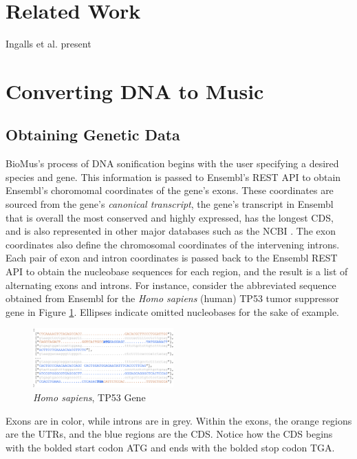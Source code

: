 \documentclass[letterpaper]{article}
\begin{document}
\section{Related Work}

Ingalls et al. present 
\section{Converting DNA to Music}
\subsection{Obtaining Genetic Data}
BioMus's process of DNA sonification begins with the user specifying a desired species and gene. This information is passed to Ensembl's REST API to obtain Ensembl's choromomal coordinates of the gene's exons. These coordinates are sourced from the gene's \textit{canonical transcript}, the gene's transcript in Ensembl that is overall the most conserved and highly expressed, has the longest CDS, and is also represented in other major databases such as the NCBI \cite{ensembl_transcript_flags}. The exon coordinates also define the chromosomal coordinates of the intervening introns. Each pair of exon and intron coordinates is passed back to the Ensembl REST API to obtain the nucleobase sequences for each region, and the result is a list of alternating exons and introns. For instance, consider the abbreviated sequence obtained from Ensembl for the \textit{Homo sapiens} (human) TP53 tumor suppressor gene in Figure \ref{fig:pre_processed_seq_homo_sapiens_tp53}. Ellipses indicate omitted nucleobases for the sake of example.

\begin{figure}[h!]
\centering
\includegraphics[width=0.48\textwidth]{images/pre_processed_seq_homo_sapiens_tp53_ABBREV}
  \caption{\textit{Homo sapiens}, TP53 Gene}\label{fig:pre_processed_seq_homo_sapiens_tp53}
  \vspace{-3mm}
\end{figure}

Exons are in color, while introns are in grey. Within the exons, the orange regions are the UTRs, and the blue regions are the CDS. Notice how the CDS begins with the bolded start codon ATG and ends with the bolded stop codon TGA. 
\end{document}
